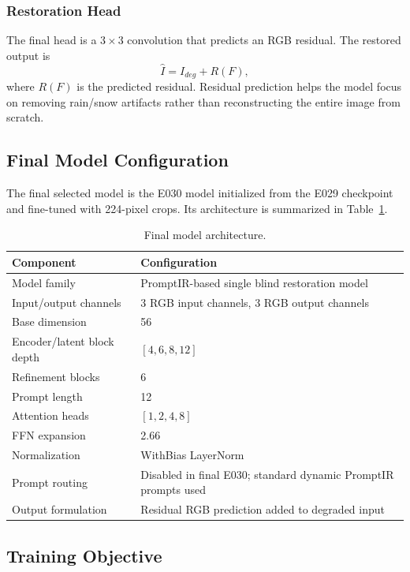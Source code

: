 \documentclass[10pt,conference]{article}
\begin{document}
\subsubsection{Restoration Head}

The final head is a $3\times3$ convolution that predicts an RGB residual. The restored output is
\begin{equation}
    \hat{I} = I_{deg} + R(F),
\end{equation}
where $R(F)$ is the predicted residual. Residual prediction helps the model focus on removing rain/snow artifacts rather than reconstructing the entire image from scratch.

\subsection{Final Model Configuration}

The final selected model is the E030 model initialized from the E029 checkpoint and fine-tuned with 224-pixel crops. Its architecture is summarized in Table~\ref{tab:final_architecture}.

\begin{table}[H]
\centering
\caption{Final model architecture.}
\label{tab:final_architecture}
\begin{tabularx}{\linewidth}{lX}
\toprule
Component & Configuration \\
\midrule
Model family & PromptIR-based single blind restoration model \\
Input/output channels & 3 RGB input channels, 3 RGB output channels \\
Base dimension & 56 \\
Encoder/latent block depth & $[4,6,8,12]$ \\
Refinement blocks & 6 \\
Prompt length & 12 \\
Attention heads & $[1,2,4,8]$ \\
FFN expansion & 2.66 \\
Normalization & WithBias LayerNorm \\
Prompt routing & Disabled in final E030; standard dynamic PromptIR prompts used \\
Output formulation & Residual RGB prediction added to degraded input \\
\bottomrule
\end{tabularx}
\end{table}

\subsection{Training Objective}
\end{document}
